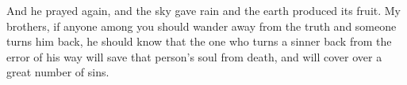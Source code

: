 \begin{biblechapter}
\verse And he prayed again, and the sky gave rain and the earth produced its fruit.
\verse My brothers, if anyone among you should wander away from the truth and someone turns him back,
\verse he should know that the one who turns a sinner back from the error of his way will save that person’s soul from death, and will cover over a great number of sins.
\end{biblechapter}

